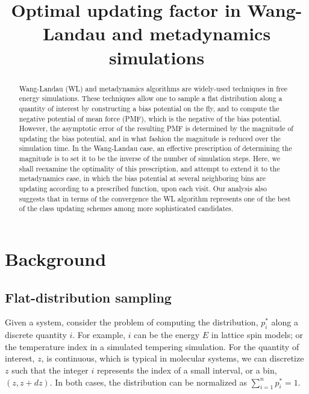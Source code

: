\documentclass[reprint]{revtex4-1}
\begin{document}
\title{Optimal updating factor in Wang-Landau and metadynamics simulations}

\begin{abstract}
  Wang-Landau (WL) and metadynamics algorithms
  are widely-used techniques in free energy simulations.
  These techniques allow one to sample a flat distribution
  along a quantity of interest
  by constructing a bias potential on the fly,
  and to compute the negative potential of mean force (PMF),
  which is the negative of the bias potential.
  However, the asymptotic error of the resulting PMF
  is determined by the magnitude of updating the bias potential,
  and in what fashion the magnitude is reduced
  over the simulation time.
  In the Wang-Landau case,
  an effective prescription of determining the magnitude
  is to set it to be the inverse of the number of simulation steps.
  Here, we shall reexamine the optimality of this prescription,
  and attempt to extend it to the metadynamics case,
  in which the bias potential at several neighboring bins
  are updating according to a prescribed function,
  upon each visit.
  Our analysis also suggests that in terms of the convergence
  the WL algorithm represents one of the best of the class
  updating schemes among more sophisticated candidates.
\end{abstract}

\maketitle



\section{Background}



\subsection{Flat-distribution sampling}



Given a system,
consider the problem of computing
the distribution, $p^*_i$
along a discrete quantity $i$.
%
%
For example, $i$ can be the energy $E$
in lattice spin models; or the temperature index
in a simulated tempering simulation.
%
For the quantity of interest, $z$, is continuous,
which is typical in molecular systems,
we can discretize $z$
such that the integer $i$ represents
the index of a small interval, or a bin, $(z, z + dz)$.
%
In both cases,
the distribution can be normalized as
$\sum_{i = 1}^n p^*_i = 1$.
\end{document}
